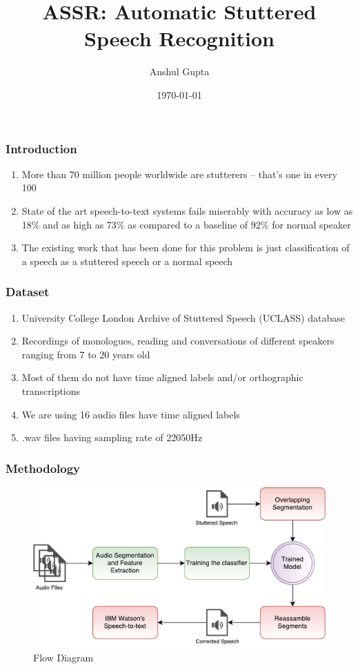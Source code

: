 \documentclass{beamer}
\title{ASSR: Automatic Stuttered Speech Recognition}
\author{Anshul Gupta}
\institute{IIT Bombay}
\date{\today}
\begin{document}
\begin{frame}
\titlepage
\end{frame}

\begin{frame}
\frametitle{Introduction}
\begin{enumerate}
 \item More than 70 million people worldwide are stutterers -- that's one in every 100
 \item State of the art speech-to-text systems fails miserably with accuracy as low as 18\% and as high as 73\% as compared to a baseline of 92\% for normal speaker \cite{siriStats}
 \item The existing work \cite{manuChopra} that has been done for this problem is just classification of a speech as a stuttered speech or a normal speech
\end{enumerate}
\end{frame}

\begin{frame}
\frametitle{Dataset}
\begin{enumerate}
 \item University College London Archive of Stuttered Speech (UCLASS) \cite{uclass} database
 \item Recordings of monologues, reading and conversations of different speakers ranging from 7 to 20 years old
 \item Most of them do not have time aligned labels and/or orthographic transcriptions
 \item We are using 16 audio files have time aligned labels
 \item .wav files having sampling rate of 22050Hz
\end{enumerate}

\end{frame}

\begin{frame}
\frametitle{Methodology}
\begin{figure}[ht]
    \centering
    \includegraphics[scale=0.60]{FlowDiagram.pdf}
    \caption{Flow Diagram}
    \label{fig:flowdiagram}
\end{figure}

\end{frame}
\end{document}
